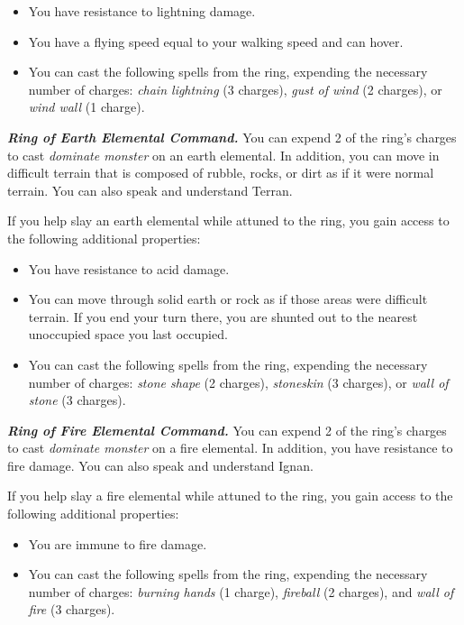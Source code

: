 \documentclass[
]{article}
\providecommand{\tightlist}{%
  \setlength{\itemsep}{0pt}\setlength{\parskip}{0pt}}
\begin{document}
\begin{itemize}
\tightlist
\item
  You have resistance to lightning damage.
\item
  You have a flying speed equal to your walking speed and can hover.
\item
  You can cast the following spells from the ring, expending the
  necessary number of charges: \emph{chain lightning} (3 charges),
  \emph{gust of wind} (2 charges), or \emph{wind wall} (1 charge).
\end{itemize}

\emph{\textbf{Ring of Earth Elemental Command.}} You can expend 2 of the
ring's charges to cast \emph{dominate monster} on an earth elemental. In
addition, you can move in difficult terrain that is composed of rubble,
rocks, or dirt as if it were normal terrain. You can also speak and
understand Terran.

If you help slay an earth elemental while attuned to the ring, you gain
access to the following additional properties:

\begin{itemize}
\tightlist
\item
  You have resistance to acid damage.
\item
  You can move through solid earth or rock as if those areas were
  difficult terrain. If you end your turn there, you are shunted out to
  the nearest unoccupied space you last occupied.
\item
  You can cast the following spells from the ring, expending the
  necessary number of charges: \emph{stone shape} (2 charges),
  \emph{stoneskin} (3 charges), or \emph{wall of stone} (3 charges).
\end{itemize}

\emph{\textbf{Ring of Fire Elemental Command.}} You can expend 2 of the
ring's charges to cast \emph{dominate monster} on a fire elemental. In
addition, you have resistance to fire damage. You can also speak and
understand Ignan.

If you help slay a fire elemental while attuned to the ring, you gain
access to the following additional properties:

\begin{itemize}
\tightlist
\item
  You are immune to fire damage.
\item
  You can cast the following spells from the ring, expending the
  necessary number of charges: \emph{burning hands} (1 charge),
  \emph{fireball} (2 charges), and \emph{wall of fire} (3 charges).
\end{itemize}
\end{document}
